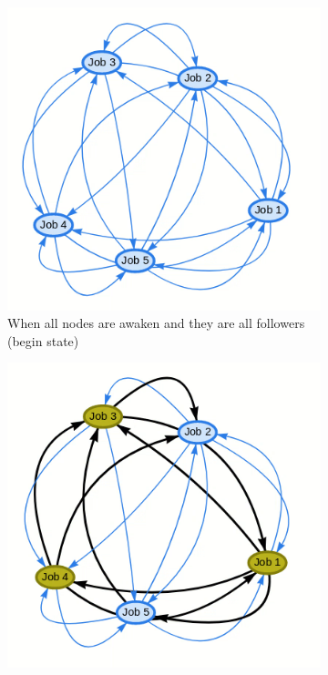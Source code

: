 \documentclass{eplmastersthesis}
\begin{document}
        \begin{figure}[H]
          \begin{subfigure}{.45\textwidth}
            \centering
            \includegraphics[width=1.0\linewidth]{figures/user_case/election_1.png}
            \caption{When all nodes are awaken and they are all followers (begin state)}
            \label{fig:ele1}
          \end{subfigure}\hspace{0.1\textwidth}
          \begin{subfigure}{.45\textwidth}
            \centering
            \includegraphics[width=1.0\linewidth]{figures/user_case/election_2.png}

\end{subfigure}
\end{figure}
\end{document}
